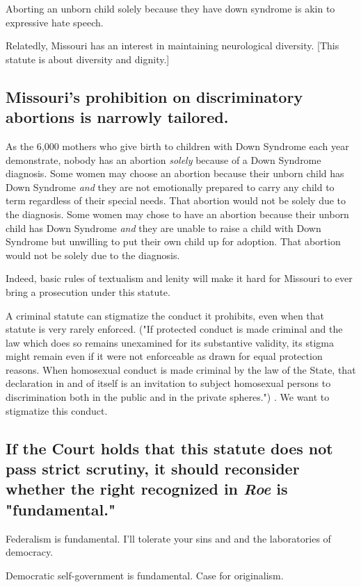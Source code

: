 \documentclass[12pt,\documentclassflag]{SCOTUS_Brief}
\begin{document}
Aborting an unborn child solely because they have down syndrome is akin to expressive hate speech.

Relatedly, Missouri has an interest in maintaining neurological diversity. [This statute is about diversity and dignity.]

\subsection{Missouri's prohibition on discriminatory abortions is narrowly tailored.}

As the 6,000 mothers who give birth to children with Down Syndrome each year demonstrate, nobody has an abortion \textit{solely} because of a Down Syndrome diagnosis. Some women may choose an abortion because their unborn child has Down Syndrome \textit{and} they are not emotionally prepared to carry any child to term regardless of their special needs. That abortion would not be solely due to the diagnosis. Some women may chose to have an abortion because their unborn child has Down Syndrome \textit{and} they are unable to raise a child with Down Syndrome but unwilling to put their own child up for adoption. That abortion would not be solely due to the diagnosis. 

Indeed, basic rules of textualism and lenity will make it hard for Missouri to ever bring a prosecution under this statute. 

A criminal statute can stigmatize the conduct it prohibits, even when that statute is very rarely enforced. ("If protected conduct is made criminal and the law which does so remains unexamined for its substantive validity, its stigma might remain even if it were not enforceable as drawn for equal protection reasons. When homosexual conduct is made criminal by the law of the State, that declaration in and of itself is an invitation to subject homosexual persons to discrimination both in the public and in the private spheres.") . We want to stigmatize this conduct.

\subsection{If the Court holds that this statute does not pass strict scrutiny, it should reconsider whether the right recognized in \textit{Roe} is "fundamental."}

Federalism is fundamental. I'll tolerate your sins and and the laboratories of democracy.

Democratic self-government is fundamental. Case for originalism.



\makeendmatter 
\end{document}
